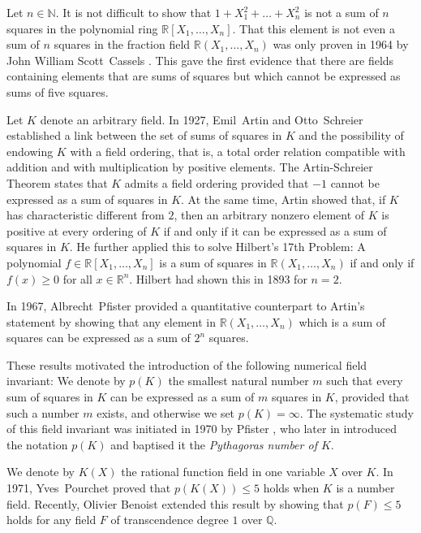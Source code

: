 \documentclass[12pt,leqno]{amsart}
\newcommand{\qq}{\mathbb Q}
\newcommand{\nat}{\mathbb{N}}
\newcommand{\rr}{\mathbb R}
\renewcommand{\leq}{\leqslant}
\renewcommand{\geq}{\geqslant}
\numberwithin{equation}{section}
\theoremstyle{definition}
\theoremstyle{plain}
\begin{document}
Let $n\in\nat$.
It is not difficult to show  that $1+X_1^2+\dots+X_n^2$ is not a sum of $n$ squares in the polynomial ring $\rr[X_1,\dots,X_n]$. That this element is not even a sum of $n$ squares in the fraction field $\rr(X_1,\dots,X_n)$ was only proven in 1964 by John William Scott~Cassels \cite{Cas64}.
This gave the first evidence that there are fields containing elements that are sums of squares but which cannot be expressed as sums of five squares.

Let $K$ denote an arbitrary field. 
In 1927, 
Emil~Artin and Otto~Schreier \cite{AS27} established a link between the set of sums of squares in $K$ and the possibility of endowing $K$ with a field ordering, that is, a total order relation compatible with addition and with multiplication by positive elements.
The Artin-Schreier Theorem states that $K$ admits a field ordering provided that $-1$ cannot be expressed as a sum of squares in $K$.
At the same time, Artin \cite{Art27} showed that, if $K$ has characteristic different from $2$, then an arbitrary nonzero element of $K$ is positive at every ordering of $K$ if and only if it can be expressed as a sum of squares in $K$.
He further applied this to solve Hilbert's 17th Problem: A polynomial 
$f\in \rr[X_1,\dots,X_n]$ is a sum of squares in $\rr(X_1,\dots,X_n)$ if and only if $f(x)\geq 0$ for all $x\in \rr^n$.
Hilbert \cite{Hil93} had shown this in 1893 for $n=2$.

In 1967, Albrecht~Pfister \cite{Pfi67} provided a quantitative counterpart to Artin's statement by showing that any element in $\rr(X_1,\dots,X_n)$ which is a sum of squares can be expressed as a sum of $2^n$ squares.

These results motivated the introduction of the following numerical field invariant:
We denote by $p(K)$ the smallest natural number $m$ such that every 
sum of squares in $K$ can be expressed as a sum of $m$ squares in $K$, provided that such a number $m$ exists, and otherwise we set $p(K)=\infty$. 
The systematic study of this field invariant was initiated in 1970 by Pfister \cite{Pfi71b}, who later in \cite{Pfi76} introduced the notation $p(K)$ and baptised it the \emph{Pythagoras number of $K$}.

 We denote by $K(X)$ the rational function field in one variable $X$ over $K$.
In 1971, Yves~Pourchet \cite{Pou71} proved that $p(K(X))\leq 5$ holds when $K$ is a number field.
Recently, Olivier Benoist \cite{Ben25} extended this result by showing that  $p(F)\leq 5$ holds for any field $F$ of transcendence degree $1$ over $\qq$.
\end{document}
